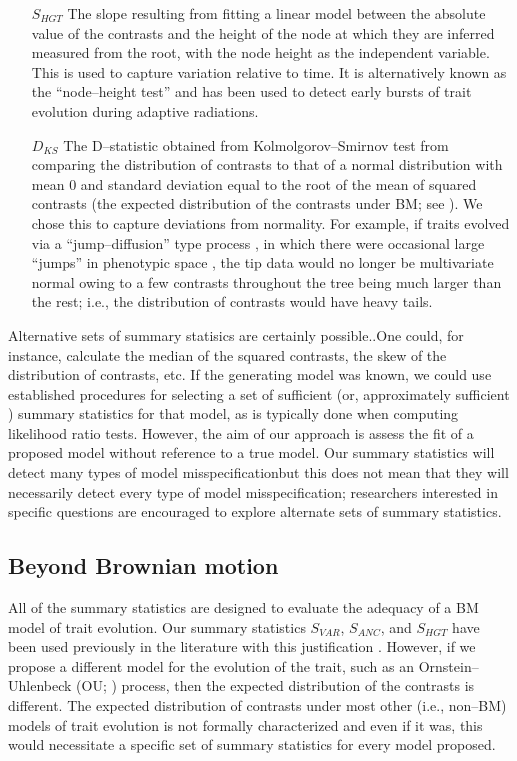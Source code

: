 \documentclass[a4paper,12pt]{article}
\begin{document}
\begin{enumerate}
\item[$S_{HGT}$] The slope resulting from fitting a linear model between the absolute value of the contrasts and the height of the node at which they are inferred measured from the root, with the node height as the independent variable. This is used to capture variation relative to time. It is alternatively known as the ``node--height test'' \citep{FreckletonHarvey2006, SlaterPennell} and has been used to detect early bursts of trait evolution during adaptive radiations. 

\item[$D_{KS}$] The D--statistic obtained from Kolmolgorov--Smirnov test from comparing the distribution of contrasts to that of a normal distribution with mean $0$ and standard deviation equal to the root of the mean of squared contrasts (the expected distribution of the contrasts under BM; see \citep{Felsenstein1985, Rohlf2001}). We chose this to capture deviations from normality. For example, if traits evolved via a ``jump--diffusion'' type process \citep{Landis2012}, in which there were occasional large ``jumps'' in phenotypic space \citep{PennellPE}, the tip data would no longer be multivariate normal owing to a few contrasts throughout the tree being much larger than the rest; i.e., the distribution of contrasts would have heavy tails. 

\end{enumerate}

Alternative sets of summary statisics are certainly possible..One could, for instance, calculate the median of the squared contrasts, the skew of the distribution of contrasts, etc. If the generating model was known, we could use established procedures for selecting a set of sufficient (or, approximately sufficient \citep{MajoramJoyce}) summary statistics for that model, as is typically done when computing likelihood ratio tests. However, the aim of our approach is assess the fit of a proposed model without reference to a true model. Our summary statistics will detect many types of model misspecificationbut this does not mean that they will necessarily detect every type of model misspecification; researchers interested in specific questions are encouraged to explore alternate sets of summary statistics. 

\subsection*{Beyond Brownian motion}

All of the summary statistics are designed to evaluate the adequacy of a BM model of trait evolution. Our summary statistics $S_{VAR}$, $S_{ANC}$, and $S_{HGT}$ have been used previously in the literature with this justification \citep{Garland1992, Garland1993,  Diaz1996}. However, if we propose a different model for the evolution of the trait, such as an Ornstein--Uhlenbeck (OU; \citep{Hansen1997}) process, then the expected distribution of the contrasts is different. The expected distribution of contrasts under most other (i.e., non--BM) models of trait evolution is not formally characterized and even if it was, this would necessitate a specific set of summary statistics for every model proposed.
\end{document}
